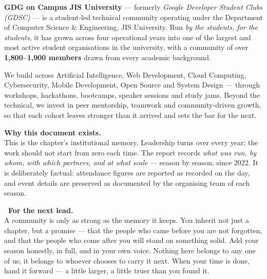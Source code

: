 \documentclass[11pt,a4paper]{article}
\begin{document}
\textbf{GDG on Campus JIS University} — formerly \emph{Google Developer Student Clubs (GDSC)} —
is a student-led technical community operating under the Department of Computer Science \&
Engineering, JIS University. Run \emph{by the students, for the students}, it has grown across
four operational years into one of the largest and most active student organisations in the
university, with a community of over \textbf{1{,}800–1{,}900 members} drawn from every academic
background.

We build across Artificial Intelligence, Web Development, Cloud Computing, Cybersecurity, Mobile
Development, Open Source and System Design — through workshops, hackathons, bootcamps, speaker
sessions and study jams. Beyond the technical, we invest in peer mentorship, teamwork and
community-driven growth, so that each cohort leaves stronger than it arrived and sets the bar for
the next.

\vspace{4pt}
\begin{tcolorbox}[enhanced,colback=Mist,colframe=Mist,arc=4pt,left=14pt,right=14pt,top=10pt,bottom=10pt,
    borderline west={3pt}{0pt}{GBlue}]
  {\bfseries\color{Ink}Why this document exists.}\\[2pt]
  This is the chapter's institutional memory. Leadership turns over every year; the work should not
  start from zero each time. The report records \emph{what was run, by whom, with which partners, and
  at what scale} — season by season, since 2022. It is deliberately factual: attendance figures are
  reported as recorded on the day, and event details are preserved as documented by the organising
  team of each season.
\end{tcolorbox}

\begin{tcolorbox}[enhanced,colback=white,colframe=GGrn,boxrule=1pt,arc=4pt,
    left=14pt,right=14pt,top=10pt,bottom=10pt]
  {\bfseries\color{GGrn}\faArrowRight~For the next lead.}\\[2pt]
  A community is only as strong as the memory it keeps. You inherit not just a chapter, but a
  promise — that the people who came before you are not forgotten, and that the people who come
  after you will stand on something solid. Add your season honestly, in full, and in your own voice.
  Nothing here belongs to any one of us; it belongs to whoever chooses to carry it next. When your
  time is done, hand it forward — a little larger, a little truer than you found it.
\end{tcolorbox}
\end{document}
